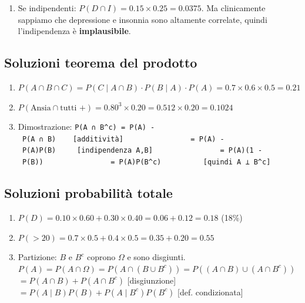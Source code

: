 \documentclass[
  letterpaper,
  DIV=11,
  numbers=noendperiod,
  oneside]{scrreprt}
\providecommand{\tightlist}{%
  \setlength{\itemsep}{0pt}\setlength{\parskip}{0pt}}
\theoremstyle{definition}
\theoremstyle{plain}
\theoremstyle{definition}
\theoremstyle{remark}
\begin{document}
\begin{tcolorbox}
\begin{enumerate}
  \begin{enumerate}
  \def\labelenumii{\alph{enumii}.}
  \tightlist
  \item
    Tabella con \(A\) = \{TT, TC\}, \(B\) = \{TT, TC, CT\}
  \item
    \(P(A \mid B) = P(\{TT, TC\}) / P(B) = (1/2) / (3/4) = 2/3\)
  \item
    \(P(A) = 1/2 \neq 2/3 = P(A \mid B)\). NON indipendenti.
  \end{enumerate}
\item
  Se indipendenti: \(P(D \cap I) = 0.15 \times 0.25 = 0.0375\). Ma
  clinicamente sappiamo che depressione e insonnia sono altamente
  correlate, quindi l'indipendenza è \textbf{implausibile}.
\end{enumerate}

\subsection{Soluzioni teorema del
prodotto}\label{soluzioni-teorema-del-prodotto}

\begin{enumerate}
\def\labelenumi{\arabic{enumi}.}
\setcounter{enumi}{11}
\item
  \(P(A \cap B \cap C) = P(C \mid A \cap B) \cdot P(B \mid A) \cdot P(A) = 0.7 \times 0.6 \times 0.5 = 0.21\)
\item
  \(P(\text{Ansia} \cap \text{tutti +}) = 0.80^3 \times 0.20 = 0.512 \times 0.20 = 0.1024\)
\item
  Dimostrazione:
  \texttt{P(A\ ∩\ B\^{}c)\ =\ P(A)\ -\ P(A\ ∩\ B)\ \ \ \ {[}additività{]}\ \ \ \ \ \ \ \ \ \ \ \ \ \ \ \ =\ P(A)\ -\ P(A)P(B)\ \ \ \ \ {[}indipendenza\ A,B{]}\ \ \ \ \ \ \ \ \ \ \ \ \ \ \ \ =\ P(A)(1\ -\ P(B))\ \ \ \ \ \ \ \ \ \ \ \ \ \ \ \ =\ P(A)P(B\^{}c)\ \ \ \ \ \ \ \ \ \ {[}quindi\ A\ ⊥\ B\^{}c{]}}
\end{enumerate}

\subsection{Soluzioni probabilità
totale}\label{soluzioni-probabilituxe0-totale}

\begin{enumerate}
\def\labelenumi{\arabic{enumi}.}
\setcounter{enumi}{14}
\item
  \(P(D) = 0.10 \times 0.60 + 0.30 \times 0.40 = 0.06 + 0.12 = 0.18\)
  (18\%)
\item
  \(P(>20) = 0.7 \times 0.5 + 0.4 \times 0.5 = 0.35 + 0.20 = 0.55\)
\item
  Partizione: \(B\) e \(B^c\) coprono \(\Omega\) e sono disgiunti.
  \(P(A) = P(A \cap \Omega) = P(A \cap (B \cup B^c)) = P((A \cap B) \cup (A \cap B^c))\)
  \(= P(A \cap B) + P(A \cap B^c)\) {[}disgiunzione{]}
  \(= P(A \mid B) P(B) + P(A \mid B^c) P(B^c)\) {[}def. condizionata{]}
\end{enumerate}


\end{tcolorbox}
\end{document}
